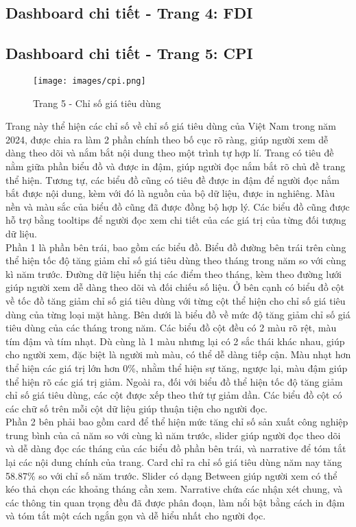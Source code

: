 \documentclass[a4paper]{report}
\begin{document}
{{\subsection{Dashboard chi tiết - Trang 4: FDI}


\newpage
\subsection{Dashboard chi tiết - Trang 5: CPI}

\begin{figure}[H]
    \centering
    \texttt{[image: images/cpi.png]}
    \caption{Trang 5 - Chỉ số giá tiêu dùng}
    \label{fig:enter-label}
\end{figure}

Trang này thể hiện các chỉ số về chỉ số giá tiêu dùng của Việt Nam trong năm 2024, được chia ra làm 2 phần chính theo bố cục rõ ràng, giúp người xem dễ dàng theo dõi và nắm bắt nội dung theo một trình tự hợp lí. Trang có tiêu đề nằm giữa phần biểu đồ và được in đậm, giúp người đọc nắm bắt rõ chủ đề trang thể hiện. Tương tự, các biểu đồ cũng có tiêu đề được in đậm để người đọc nắm bắt được nội dung, kèm với đó là nguồn của bộ dữ liệu, được in nghiêng. Màu nền và màu sắc của biểu đồ cũng đã được đồng bộ hợp lý. Các biểu đồ cũng được hỗ trợ bằng tooltips để người đọc xem chi tiết của các giá trị của từng đối tượng dữ liệu.\\
Phần 1 là phần bên trái, bao gồm các biểu đồ. Biểu đồ đường bên trái trên cùng thể hiện tốc độ tăng giảm chỉ số giá tiêu dùng theo tháng trong năm so với cùng kì năm trước. Đường dữ liệu hiển thị các điểm theo tháng, kèm theo đường lưới giúp người xem dễ dàng theo dõi và đối chiếu số liệu. Ở bên cạnh có biểu đồ cột về tốc đồ tăng giảm chỉ số giá tiêu dùng với từng cột thể hiện cho chỉ số giá tiêu dùng của từng loại mặt hàng. Bên dưới là biểu đồ về mức độ tăng giảm chỉ số giá tiêu dùng của các tháng trong năm. Các biểu đồ cột đều có 2 màu rõ rệt, màu tím đậm và tím nhạt. Dù cùng là 1 màu nhưng lại có 2 sắc thái khác nhau, giúp cho người xem, đặc biệt là người mù màu, có thể dễ dàng tiếp cận. Màu nhạt hơn thể hiện các giá trị lớn hơn 0\%, nhằm thể hiện sự tăng, ngược lại, màu đậm giúp thể hiện rõ các giá trị giảm. Ngoài ra, đối với biểu đồ thể hiện tốc độ tăng giảm chỉ số giá tiêu dùng, các cột được xếp theo thứ tự giảm dần. Các biểu đồ cột có các chữ số trên mỗi cột dữ liệu giúp thuận tiện cho người đọc.\\
Phần 2 bên phải bao gồm card để thể hiện mức tăng chỉ số sản xuất công nghiệp trung bình của cả năm so với cùng kì năm trước, slider giúp người đọc theo dõi và dễ dàng đọc các tháng của các biểu đồ phần bên trái, và narrative để tóm tắt lại các nội dung chính của trang. Card chỉ ra chỉ số giá tiêu dùng năm nay tăng 58.87\% so với chỉ số năm trước. Slider có dạng Between giúp người xem có thể kéo thả chọn các khoảng tháng cần xem. Narrative chứa các nhận xét chung, và các thông tin quan trọng đều đã được phân đoạn, làm nổi bật bằng cách in đậm và tóm tắt một cách ngắn gọn và dễ hiểu nhất cho người đọc.
\newpage
}}
\end{document}
